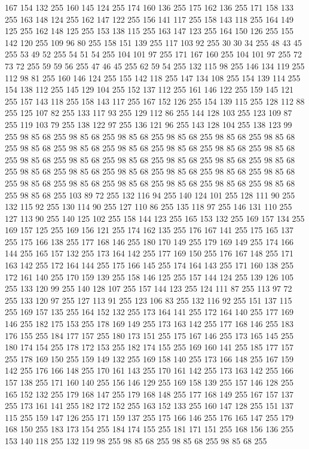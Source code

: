 167 154 132 255 160 145 124 255 174 160 136 255 175 162 136 255 171 158 133 255 163 148 124 255 162 147 122 255 156 141 117 255 158 143 118 255 164 149 125 255 162 148 125 255 153 138 115 255 163 147 123 255 164 150 126 255 155 142 120 255 109 96 80 255 158 151 139 255 117 103 92 255 30 30 34 255 48 43 45 255 53 49 52 255 54 51 54 255 104 101 97 255 171 167 160 255 104 101 97 255 72 73 72 255 59 59 56 255 47 46 45 255 62 59 54 255 132 115 98 255 146 134 119 255 112 98 81 255 160 146 124 255 155 142 118 255 147 134 108 255 154 139 114 255 154 138 112 255 145 129 104 255 152 137 112 255 161 146 122 255 159 145 121 255 157 143 118 255 158 143 117 255 167 152 126 255 154 139 115 255 128 112 88 255 125 107 82 255 133 117 93 255 129 112 86 255 144 128 103 255 123 109 87 255 119 103 79 255 138 122 97 255 136 121 96 255 143 128 104 255 138 123 99 255 98 85 68 255 98 85 68 255 98 85 68 255 98 85 68 255 98 85 68 255 98 85 68 255 98 85 68 255 98 85 68 255
98 85 68 255 98 85 68 255 98 85 68 255 98 85 68 255 98 85 68 255 98 85 68 255 98 85 68 255 98 85 68 255 98 85 68 255 98 85 68 255 98 85 68 255 98 85 68 255 98 85 68 255 98 85 68 255 98 85 68 255 98 85 68 255 98 85 68 255 98 85 68 255 98 85 68 255 98 85 68 255 98 85 68 255 98 85 68 255 98 85 68 255 103 89 72 255 132 116 94 255 140 124 101 255 128 111 90 255 132 115 92 255 130 114 90 255 127 110 86 255 135 118 97 255 146 131 110 255 127 113 90 255 140 125 102 255 158 144 123 255 165 153 132 255 169 157 134 255 169 157 125 255 169 156 121 255 174 162 135 255 176 167 141 255 175 165 137 255 175 166 138 255 177 168 146 255 180 170 149 255 179 169 149 255 174 166 144 255 165 157 132 255 173 164 142 255 177 169 150 255 176 167 148 255 171 163 142 255 172 164 144 255 175 166 145 255 174 164 143 255 171 160 138 255 172 161 140 255 170 159 139 255 158 146 125 255 157 144 124 255 139 126 105 255 133 120 99 255 140 128 107 255 157 144 123 255
124 111 87 255 113 97 72 255 133 120 97 255 127 113 91 255 123 106 83 255 132 116 92 255 151 137 115 255 169 157 135 255 164 152 132 255 173 164 141 255 172 164 140 255 177 169 146 255 182 175 153 255 178 169 149 255 173 163 142 255 177 168 146 255 183 176 155 255 184 177 157 255 180 173 151 255 175 167 146 255 173 165 145 255 180 174 154 255 178 172 153 255 182 174 155 255 169 160 141 255 185 177 157 255 178 169 150 255 159 149 132 255 169 158 140 255 173 166 148 255 167 159 142 255 176 166 148 255 170 161 143 255 170 161 142 255 173 163 142 255 166 157 138 255 171 160 140 255 156 146 129 255 169 158 139 255 157 146 128 255 165 152 132 255 179 168 147 255 179 168 148 255 177 168 149 255 167 157 137 255 173 161 141 255 182 172 152 255 163 152 133 255 160 147 128 255 151 137 115 255 159 147 126 255 171 159 137 255 175 166 146 255 176 165 147 255 179 168 150 255 183 173 154 255 184 174 155 255 181 171 151 255 168 156 136 255 153 140 118 255 132 119 98 255 98 85 68 255 98 85 68 255 98 85 68 255
